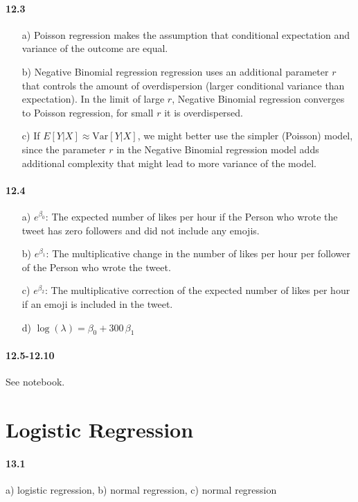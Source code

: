 \documentclass[fontsize=11pt,DIV=18,parskip=half]{scrartcl}
\begin{document}
\paragraph{12.3}
\begin{itemize}
\item[a)] Poisson regression makes the assumption that conditional expectation and variance of the outcome are equal.
\item[b)] Negative Binomial regression regression uses an additional parameter $r$ that controls the amount of overdispersion (larger conditional variance than expectation). In the limit of large $r$, Negative Binomial regression converges to Poisson regression, for small $r$ it is overdispersed.
\item[c)] If $E[Y|X] \approx \text{Var}[Y|X]$, we might better use the simpler (Poisson) model, since the parameter $r$ in the Negative Binomial regression model adds additional complexity that might lead to more variance of the model.
\end{itemize}

\paragraph{12.4}
\begin{itemize}
\item[a)] $e^{\beta_0}$: The expected number of likes per hour if the Person who wrote the tweet has zero followers and did not include any emojis.
\item[b)] $e^{\beta_1}$: The multiplicative change in the number of likes per hour per follower of the Person who wrote the tweet.
\item[c)] $e^{\beta_2}$: The multiplicative correction of the expected number of likes per hour if an emoji is included in the tweet.
\item[d)] $\log(\lambda) = \beta_0 + 300 \, \beta_1$
\end{itemize}

\paragraph{12.5-12.10} See notebook.

\section{Logistic Regression}

\paragraph{13.1} a) logistic regression, b) normal regression, c) normal regression
\end{document}
